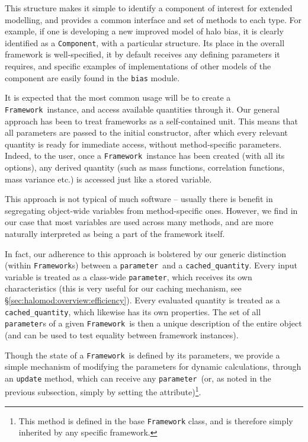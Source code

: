 \documentclass[5p,aas_macros]{elsarticle}
\newcommand{\framework}{\texttt{Framework}}
\newcommand{\component}{\texttt{Component}}
\newcommand{\parameter}{\texttt{parameter}}
\newcommand{\cached}{\texttt{cached\_quantity}}
\begin{document}
This structure makes it simple to identify a component of interest for extended modelling, and provides a common interface and set of methods to each type. For example, if one is developing a new improved model of halo bias, it is clearly identified as a \component, with a particular structure. Its place in the overall framework is well-specified, it by default receives any defining parameters it requires, and specific examples of implementations of other models of the component are easily found in the \verb|bias| module. 

It is expected that the most common usage will be to create a \framework\ instance, and access available quantities through it. Our general approach has been to treat frameworks as a self-contained unit. This means that all parameters are passed to the initial constructor, after which every relevant quantity is ready for immediate access, without method-specific parameters. Indeed, to the user, once a \framework\ instance has been created (with all its options), any derived quantity (such as mass functions, correlation functions, mass variance etc.) is accessed just like a stored variable. 

This approach is not typical of much software -- usually there is benefit in segregating object-wide variables from method-specific ones. However, we find in our case that most variables are used across many methods, and are more naturally interpreted as being a part of the framework itself. 

In fact, our adherence to this approach is bolstered by our generic distinction (within \texttt{Framework}s) between a \parameter\ and a \cached. Every input variable is treated as a class-wide \parameter, which receives its own characteristics (this is very useful for our caching mechanism, see \S\ref{sec:halomod:overview:efficiency}). Every evaluated quantity is treated as a \cached, which likewise has its own properties. The set of all \texttt{parameter}s of a given \framework\ is then a unique description of the entire object (and can be used to test equality between framework instances). 

Though the state of a \framework\ is defined by its parameters, we provide a simple mechanism of modifying the parameters for dynamic calculations, through an \verb|update| method, which can receive any \parameter\ (or, as noted in the previous subsection, simply by setting the attribute)\footnote{This method is defined in the base \texttt{Framework} class, and is therefore simply inherited by any specific framework.}.
\end{document}

